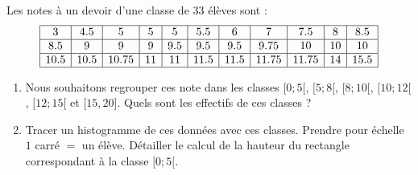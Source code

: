 
\begin{exercice}[\ldots/4]\label{exosmath-0668}

    Les notes à un devoir d'une classe de \( 33\) élèves sont :
    \begin{equation*}
        \begin{array}[]{|c|c|c|c|c|c|c|c|c|c|c|}
            \hline
            3&4.5    &5&5&5&5.5&6&7&7.5   &8&8.5\\
            \hline
            8.5&9&9&9&9.5&9.5&9.5&9.75    &10&10&10\\
            \hline
            10.5&10.5&10.75&11&11&11.5&11.5&11.75&11.75&14&15.5\\
            \hline
        \end{array}
    \end{equation*}
    \begin{enumerate}
        \item
            Nous souhaitons regrouper ces note dans les classes \( \mathopen[ 0 ;5 [\), \( \mathopen[ 5 ;8 [\), \( \mathopen[ 8 ; 10 [\), \( \mathopen[ 10; 12 [\), \( \mathopen[ 12 ; 15 [\) et \( \mathopen[ 15 , 20 \mathclose]\). Quels sont les effectifs de ces classes ?
        \item
            Tracer un histogramme de ces données avec ces classes. Prendre pour échelle \( 1\) carré \( =\) un élève. Détailler le calcul de la hauteur du rectangle correspondant à la classe \( \mathopen[ 0 ;5 [\).
    \end{enumerate}

\end{exercice}
